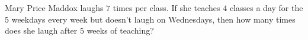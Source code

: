 Mary Price Maddox laughs $7$ times per class. If she teaches $4$ classes a day for the $5$ weekdays every week but doesn't laugh on Wednesdays, then how many times does she laugh after $5$ weeks of teaching?
